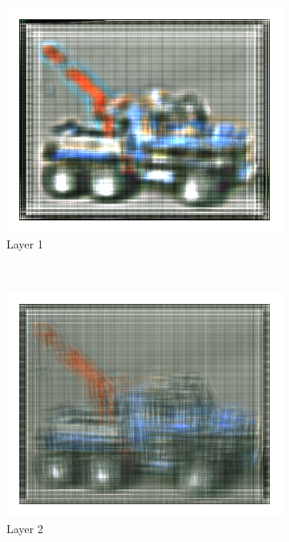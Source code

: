 \documentclass[11pt,a4paper,titlepage]{article}
\begin{document}
\newpage
\begin{figure}[h]
	\centering
	\begin{subfigure}[c]{0.3\textwidth}
 		\includegraphics[width=\textwidth]{results/legotruck_perspective_rec_3Layers_r=1/1.png}
  		\caption{Layer 1}
	\end{subfigure}%
	~
	\begin{subfigure}[c]{0.3\textwidth}
		\includegraphics[width=\textwidth]{results/legotruck_perspective_rec_3Layers_r=1/2.png}
		\caption{Layer 2}
	\end{subfigure}%
	~
	\begin{subfigure}[c]{0.3\textwidth}

\end{subfigure}
\end{figure}
\end{document}
